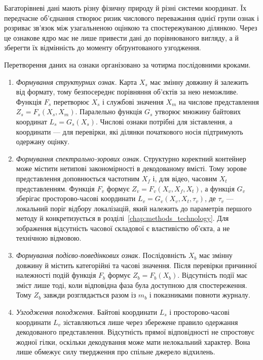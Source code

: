 Багаторівневі дані мають різну фізичну природу й різні системи координат. Їх передчасне об’єднання створює ризик числового переважання однієї групи ознак і розриває зв’язок між узагальненою оцінкою та спостережуваною ділянкою. Через це ознакове ядро має не лише привести дані до порівнюваного вигляду, а й зберегти їх відмінність до моменту обґрунтованого узгодження.

Перетворення даних на ознаки організовано за чотирма послідовними кроками.

\begin{enumerate}
\item \textit{Формування структурних ознак.} Карта $X_s$ має змінну довжину й залежить від формату, тому безпосереднє порівняння об’єктів за нею неможливе. Функція $F_s$ перетворює $X_s$ і службові значення $X_m$ на числове представлення $Z_s=F_s(X_s,X_m)$. Паралельно функція $G_s$ утворює множину байтових координат $L_s=G_s(X_s)$. Числові ознаки потрібні для зіставлення, а координати --- для перевірки, які ділянки початкового носія підтримують одержану оцінку.

\item \textit{Формування спектрально-зорових ознак.} Структурно коректний контейнер може містити нетипові закономірності в декодованому вмісті. Тому зорове представлення доповнюється частотним $X_f$ і, для відео, часовим $X_t$ представленням. Функція $F_v$ формує $Z_v=F_v(X_v,X_f,X_t)$, а функція $G_v$ зберігає просторово-часові координати $L_v=G_v(X_v,X_t,\tau_v)$, де $\tau_v$ --- локальний поріг відбору локалізацій, який належить до параметрів першого методу й конкретизується в розділі~\ref{chap:methods_technology}. Для зображення відсутність часової складової є властивістю об’єкта, а не технічною відмовою.

\item \textit{Формування подієво-поведінкових ознак.} Послідовність $X_b$ має змінну довжину й містить категорійні та часові значення. Після перевірки причинної належності подій функція $F_b$ формує $Z_b=F_b(X_b)$. Відсутність події має зміст лише тоді, коли відповідна фаза була доступною для спостереження. Тому $Z_b$ завжди розглядається разом із $m_b$ і показниками повноти журналу.

\item \textit{Узгодження походження.} Байтові координати $L_s$ і просторово-часові координати $L_v$ зіставляються лише через збережене правило одержання декодованого представлення. Відсутність прямої відповідності не спростовує жодної гілки, оскільки декодування може мати нелокальний характер. Вона лише обмежує силу твердження про спільне джерело відхилень.
\end{enumerate}

